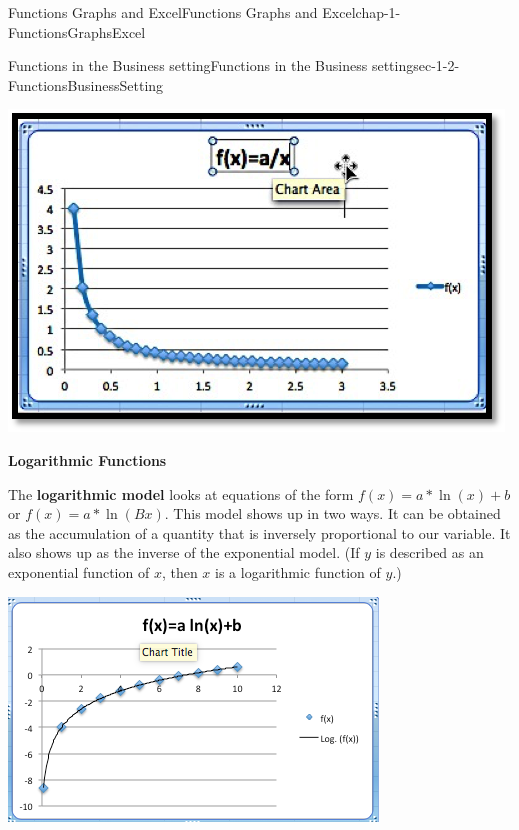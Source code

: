 \documentclass[oneside,10pt,]{book}
\newcommand{\terminology}[1]{\textbf{#1}}
\numberwithin{equation}{section}
\begin{document}
\begin{chapterptx}{Functions Graphs and Excel}{}{Functions Graphs and Excel}{}{}{chap-1-FunctionsGraphsExcel}
\begin{sectionptx}{Functions in the Business setting}{}{Functions in the Business setting}{}{}{sec-1-2-FunctionsBusinessSetting}
\begin{sidebyside}{1}{0.25}{0.25}{0}
\begin{sbspanel}{0.5}
\includegraphics[width=1\linewidth]{images/sec1-2-InverseCurve.png}
\end{sbspanel}%
\end{sidebyside}%
\par
\hypertarget{p-168}{}%
\terminology{Logarithmic Functions}%
\par
\hypertarget{p-169}{}%
The \terminology{logarithmic model} looks at equations of the form \(f(x)=a*\ln (x)+b\) or \(f(x)=a*\ln (Bx)\).  This model shows up in two ways.  It can be obtained as the accumulation of a quantity that is inversely proportional to our variable.  It also shows up as the inverse of the exponential model.  (If \(y\) is described as an exponential function of \(x\), then \(x\) is a logarithmic function of \(y\).)%
\begin{sidebyside}{1}{0.25}{0.25}{0}%
\begin{sbspanel}{0.5}%
\includegraphics[width=1\linewidth]{images/sec1-2-LogCurve.png}
\end{sbspanel}%

\end{sidebyside}
\end{sectionptx}
\end{chapterptx}
\end{document}
